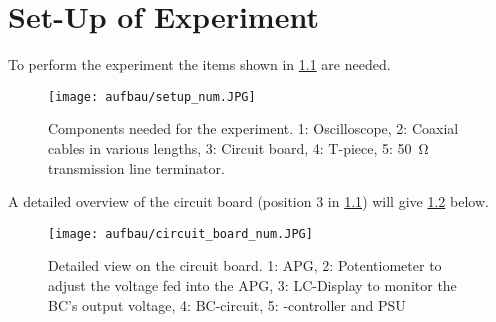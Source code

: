 \chapter{Set-Up of Experiment}
    To perform the experiment the items shown in \cref{fig:setup} are needed.
    \begin{figure}[H]
        \centering
            \texttt{[image: aufbau/setup\_num.JPG]}
        \caption{Components needed for the experiment. 1: Oscilloscope, 2: Coaxial cables in various lengths, 3: Circuit board, 4: T-piece, 5: \SI{50}{\ohm} transmission line terminator.}
        \label{fig:setup}
    \end{figure}
    A detailed overview of the circuit board (position 3 in \cref{fig:setup}) will give \cref{fig:circuit_board} below.
    \begin{figure}[H]
        \centering
        \texttt{[image: aufbau/circuit\_board\_num.JPG]}
        \caption{Detailed view on the circuit board. 1: APG, 2: Potentiometer to adjust the voltage fed into the APG, 3: LC-Display to monitor
        the BC's output voltage, 4: BC-circuit, 5: \micro-controller and PSU}
        \label{fig:circuit_board}
    \end{figure}
